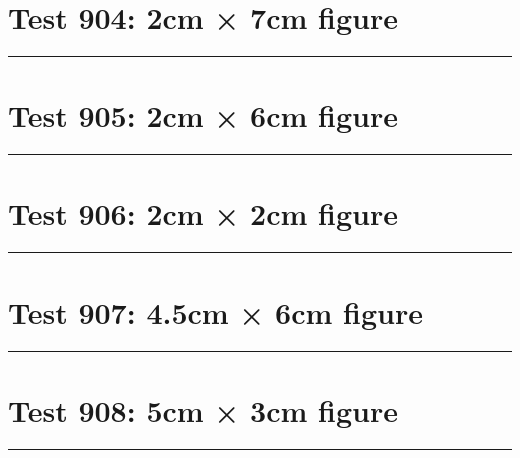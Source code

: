 \documentclass[a4paper,11pt]{article}
\begin{document}
\section*{Test 904: 2cm × 7cm figure}
\begin{swarmwrap}%
  \begin{minipage}[t]{2cm}
    \centering
    \rule{\linewidth}{7cm}
  \end{minipage}%
\end{swarmwrap}%
\swarmwrapnext
\lipsum[111]
\lipsum[112]
\lipsum[113]
\section*{Test 905: 2cm × 6cm figure}
\begin{swarmwrap}%
  \begin{minipage}[t]{2cm}
    \centering
    \rule{\linewidth}{6cm}
  \end{minipage}%
\end{swarmwrap}%
\swarmwrapnext
\lipsum[53]
\lipsum[54]
\lipsum[55]
\lipsum[56]
\lipsum[57]
\lipsum[58]
\section*{Test 906: 2cm × 2cm figure}
\begin{swarmwrap}%
  \begin{minipage}[t]{2cm}
    \centering
    \rule{\linewidth}{2cm}
  \end{minipage}%
\end{swarmwrap}%
\swarmwrapnext
\lipsum[45]
\lipsum[46]
\lipsum[47]
\lipsum[48]
\section*{Test 907: 4.5cm × 6cm figure}
\begin{swarmwrap}%
  \begin{minipage}[t]{4cm}
    \centering
    \rule{\linewidth}{6cm}
  \end{minipage}%
\end{swarmwrap}%
\swarmwrapnext
\lipsum[123]
\lipsum[124]
\lipsum[125]
\section*{Test 908: 5cm × 3cm figure}
\begin{swarmwrap}%
  \begin{minipage}[t]{5cm}
    \centering
    \rule{\linewidth}{3cm}
  \end{minipage}%
\end{swarmwrap}%
\swarmwrapnext
\lipsum[103]
\lipsum[104]
\lipsum[105]
\lipsum[106]
\lipsum[107]
\end{document}
